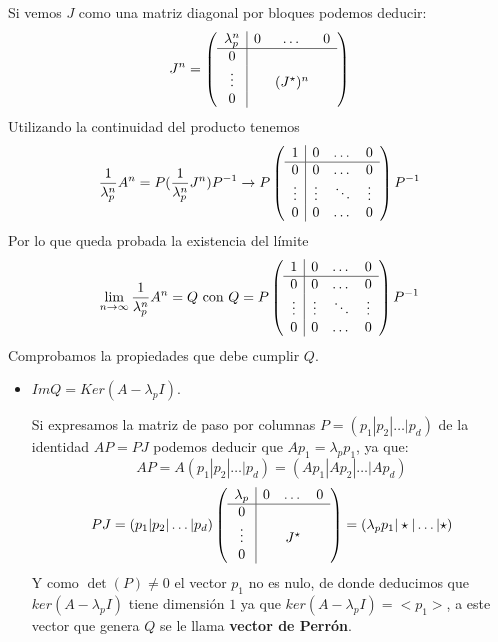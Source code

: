 \documentclass[size=a4, parskip=half, titlepage=false, toc=flat, toc=bib, 12pt]{scrartcl}
\makeatletter
\renewenvironment{proof}[1][\proofname] {\par\pushQED{\qed}\normalfont\topsep6\p@\@plus6\p@\relax\trivlist\item[\hskip\labelsep\itshape\sffamily#1\@addpunct{.}]\ignorespaces}{\popQED\endtrivlist\@endpefalse}
\theoremstyle{theorem-style}
\theoremstyle{definition-style}
\theoremstyle{remark-style}
\theoremstyle{example-style}
\theoremstyle{definition-style}
\theoremstyle{remark-style}
\makeatother
\begin{document}
\begin{proof}
Si vemos $J$ como una matriz diagonal por bloques podemos deducir:
$$J^n =      \left(
      \begin{array}{{c|ccc}}
        \lambda_p^n     &    0      &   \dots    & 0\\\hline
            0         &           &        &  \\
            \vdots    &           & (J^{\star})^n &  \\
           0          &           &        &
      \end{array}
    \right)$$
Utilizando la continuidad del producto tenemos
$$\frac{1}{\lambda_p^n} A^n = P (\frac{1}{\lambda_p^n}  J^n)P^{-1} \rightarrow P \left(
      \begin{array}{{c|ccc}}
            1         &    0      &   \dots    & 0\\\hline
            0         &    0       &    \dots    & 0 \\
            \vdots    &    \vdots  &  \ddots &  \vdots \\
           0          &     0       &    \dots    & 0
      \end{array}   \right) P^{-1}$$
Por lo que queda probada la existencia del límite
$$\lim_{n \to \infty} \frac{1}{\lambda_p^n} A^n  = Q \  \textrm{con} \ Q = P \left(
      \begin{array}{{c|ccc}}
            1         &    0      &   \dots    & 0\\\hline
            0         &    0       &    \dots    & 0 \\
            \vdots    &    \vdots  &  \ddots &  \vdots \\
           0          &     0       &    \dots    & 0
      \end{array}   \right) P^{-1} $$
Comprobamos la propiedades que debe cumplir $Q$.
\begin{itemize}
\item $Im Q = Ker (A - \lambda_p I)$.

Si expresamos la matriz de paso por columnas $P = (p_1 | p_2 | \dots | p_d)$ de la identidad $AP = PJ$ podemos deducir que $Ap_1 = \lambda_p p_1$, ya que:
$$AP = A (p_1 | p_2 | \dots | p_d) = (A p_1 |A p_2 | \dots |A p_d)$$
$$PJ =  (p_1 | p_2 | \dots | p_d) \left(
  \begin{array}{{c|ccc}}
    \lambda_p     &    0      &   \dots    & 0\\\hline
        0         &           &        &  \\
        \vdots    &           & J^{\star} &  \\
       0          &           &        &
  \end{array}
\right)  = ( \lambda_p p_1 | \star | \dots | \star) $$
Y como $\det(P) \neq 0$ el vector $p_1$ no es nulo, de donde deducimos que $ker(A - \lambda_p I)$ tiene dimensión $1$ ya que $ker(A - \lambda_p I) = <p_1>$, a este vector que genera $Q$ se le llama \textbf{vector de Perrón}.


\end{itemize}
\end{proof}
\end{document}
